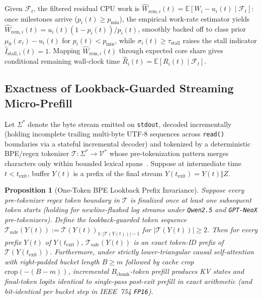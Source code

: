 \documentclass[10pt,journal,compsoc]{IEEEtran}
\newtheorem{proposition}{Proposition}
\theoremstyle{definition}
\theoremstyle{remark}
\newcommand{\E}{\mathbb{E}}
\begin{document}
Given $\mathcal{F}_t$, the filtered residual CPU work is $\hat{W}_{\mathrm{rem},i}(t) = \E[W_i - u_i(t) \mid \mathcal{F}_t]$: once milestones arrive ($p_i(t) \ge p_{\min}$), the empirical work-rate estimator yields $\hat{W}_{\mathrm{rem},i}(t) = u_i(t)(1 - p_i(t))/p_i(t)$, smoothly backed off to class prior $\mu_0(x_i) - u_i(t)$ for $p_i(t) < p_{\min}$, while $\sigma_i(t) \ge \tau_{\mathrm{stall}}$ raises the stall indicator $\hat{I}_{\mathrm{stall},i}(t) = 1$. Mapping $\hat{W}_{\mathrm{rem},i}(t)$ through expected core share gives conditional remaining wall-clock time $\hat{R}_i(t) = \E[R_i(t) \mid \mathcal{F}_t]$.

\subsection{Exactness of Lookback-Guarded Streaming Micro-Prefill}
Let $\Sigma^*$ denote the byte stream emitted on \texttt{stdout}, decoded incrementally (holding incomplete trailing multi-byte UTF-8 sequences across \texttt{read()} boundaries via a stateful incremental decoder) and tokenized by a deterministic BPE/regex tokenizer $\mathcal{T}: \Sigma^* \to \mathcal{V}^*$ whose pre-tokenization pattern merges characters only within bounded lexical spans~\cite{sennrich2016bpe}. Suppose at intermediate time $t < t_{\mathrm{exit}}$, buffer $Y(t)$ is a prefix of the final stream $Y(t_{\mathrm{exit}}) = Y(t) \Vert Z$.

\begin{proposition}[One-Token BPE Lookback Prefix Invariance]\label{prop:bpe}
Suppose every pre-tokenizer regex token boundary in $\mathcal{T}$ is finalized once at least one subsequent token starts (holding for newline-flushed log streams under \texttt{Qwen2.5} and \texttt{GPT-NeoX} pre-tokenizers). Define the lookback-guarded token sequence $\mathcal{T}_{\mathrm{safe}}(Y(t)) := \mathcal{T}(Y(t))_{1 : |\mathcal{T}(Y(t))|-1}$ for $|\mathcal{T}(Y(t))| \ge 2$. Then for every prefix $Y(t)$ of $Y(t_{\mathrm{exit}})$, $\mathcal{T}_{\mathrm{safe}}(Y(t))$ is an exact token-ID prefix of $\mathcal{T}(Y(t_{\mathrm{exit}}))$. Furthermore, under strictly lower-triangular causal self-attention with right-padded bucket length $B \ge m$ followed by cache crop $\mathrm{crop}(-(B - m))$, incremental $B_{\mathrm{chunk}}$-token prefill produces KV states and final-token logits identical to single-pass post-exit prefill in exact arithmetic (and bit-identical per bucket step in IEEE~754 \texttt{FP16}).
\end{proposition}
\end{document}
